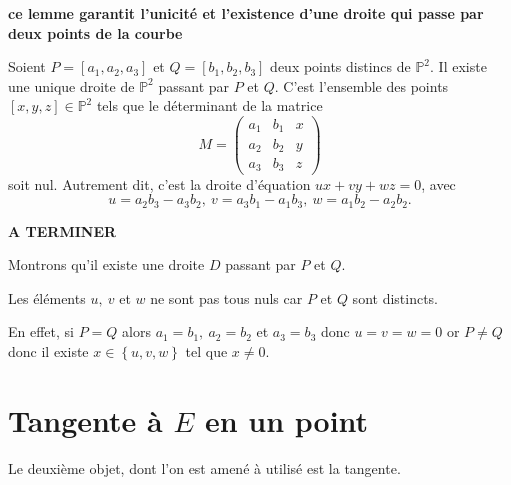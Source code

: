\textbf{ce lemme garantit l'unicité et l'existence d'une droite qui passe par deux points
de la courbe}
\begin{lemme}
    \label{lem:lemme2}
    



    Soient $P = \left[ a_1, a_2, a_3 \right]$ et $Q = \left[ b_1, b_2, b_3 \right]$ deux points distincs de $\mathbb{P}^2$. Il existe une unique droite de $\mathbb{P}^2$ passant par $P$ et $Q$. C'est l'ensemble des points $\left[ x, y, z \right] \in \mathbb{P}^2$ tels que le déterminant de la matrice
    \[
        M = 
    \begin{pmatrix}
        a_1 & b_1 & x \\ 
        a_2 & b_2 & y \\
        a_3 & b_3 & z
    \end{pmatrix}
    \] 
    soit nul. Autrement dit, c'est la droite d'équation $ux + vy + wz = 0$, avec
    \[
    u = a_2b_3 - a_3b_2, \ v = a_3b_1 - a_1b_3, \ w = a_1b_2 - a_2b_2
    .\] 
\end{lemme}

\begin{demonstration}
    \textbf{A TERMINER} 

    Montrons qu'il existe une droite $D$ passant par $P$ et $Q$.

    Les éléments $u, \ v$ et $w$ ne sont pas tous nuls car $P$ et $Q$ sont distincts.

    En effet, si $P = Q$ alors $a_1 = b_1, \ a_2 = b_2 $ et $a_3 = b_3$ donc $u = v = w =0$ or $P \neq Q$ donc il existe $x \in \left\{ u, v, w \right\}$ tel que $x \neq 0$.
    
\end{demonstration}

\section{Tangente à $E$ en un point}

Le deuxième objet, dont l'on est amené à utilisé est la tangente.

